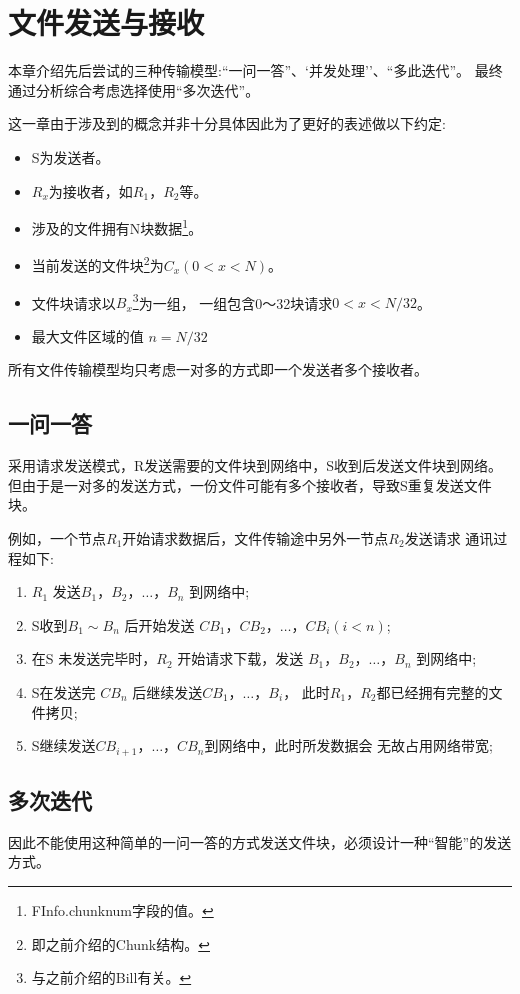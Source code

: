 \chapter{文件发送与接收}
本章介绍先后尝试的三种传输模型:``一问一答''、`并发处理''、``多此迭代''。
最终通过分析综合考虑选择使用``多次迭代''。

这一章由于涉及到的概念并非十分具体因此为了更好的表述做以下约定:
\begin{itemize}
	\item S为发送者。
	\item $R_x$为接收者，如$R_1，R_2$等。
	\item 涉及的文件拥有N块数据\footnote{FInfo.chunknum字段的值。}。
	\item 当前发送的文件块\footnote{即之前介绍的Chunk结构。}为$C_x (0<x<N)$。
	\item 文件块请求以$B_x$\footnote{与之前介绍的Bill有关。}为一组，
		一组包含0～32块请求$0 < x < N/32$。
	\item 最大文件区域的值 $n = N/32$
\end{itemize}
所有文件传输模型均只考虑一对多的方式即一个发送者多个接收者。

\section{一问一答}
采用请求发送模式，R发送需要的文件块到网络中，S收到后发送文件块到网络。
但由于是一对多的发送方式，一份文件可能有多个接收者，导致S重复发送文件块。

例如，一个节点$R_1$开始请求数据后，文件传输途中另外一节点$R_2$发送请求
通讯过程如下:
\begin{enumerate}
	\item $R_1$ 发送$B_1，B_2，\ldots，B_n$ 到网络中;
	\item S收到$B_1\sim B_n$ 后开始发送
		$CB_1，CB_2，\ldots，CB_i (i < n)$;
	\item 在S 未发送完毕时，$R_2$ 开始请求下载，发送
		$B_1，B_2，\ldots，B_n$ 到网络中;
	\item S在发送完 $CB_n$ 后继续发送$CB_1，\ldots，B_i$，
		此时$R_1，R_2$都已经拥有完整的文件拷贝;
	\item S继续发送$CB_{i+1}，\ldots，CB_n$到网络中，此时所发数据会
		无故占用网络带宽;
\end{enumerate}

\section{多次迭代}
因此不能使用这种简单的一问一答的方式发送文件块，必须设计一种``智能''的发送方式。

